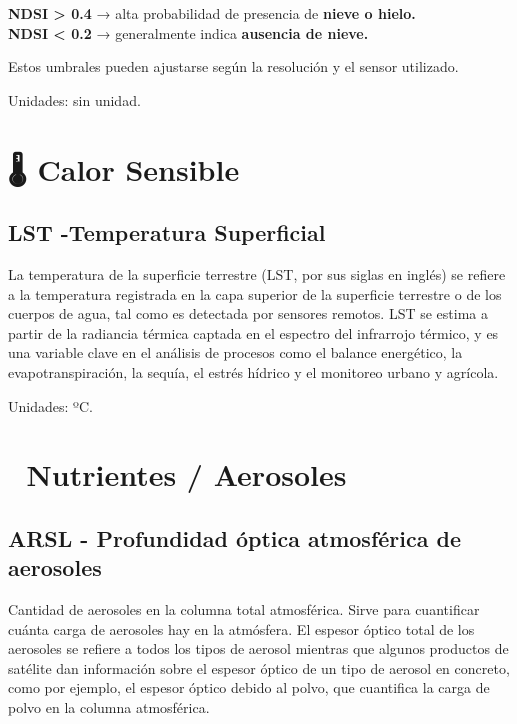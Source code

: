 \documentclass[
]{book}
\begin{document}
\textbf{NDSI \textgreater{} 0.4} → alta probabilidad de presencia de \textbf{nieve o hielo.}\\
\textbf{NDSI \textless{} 0.2} → generalmente indica \textbf{ausencia de nieve.}

Estos umbrales pueden ajustarse según la resolución y el sensor utilizado.

Unidades: sin unidad.

\section{\texorpdfstring{\textbf{🌡️ Calor Sensible}}{🌡️ Calor Sensible}}\label{calor-sensible-1}

\subsection{\texorpdfstring{\textbf{LST} -Temperatura Superficial}{LST -Temperatura Superficial}}\label{lst--temperatura-superficial-1}

La temperatura de la superficie terrestre (LST, por sus siglas en inglés) se refiere a la temperatura registrada en la capa superior de la superficie terrestre o de los cuerpos de agua, tal como es detectada por sensores remotos. LST se estima a partir de la radiancia térmica captada en el espectro del infrarrojo térmico, y es una variable clave en el análisis de procesos como el balance energético, la evapotranspiración, la sequía, el estrés hídrico y el monitoreo urbano y agrícola.

Unidades: ºC.

\section{\texorpdfstring{\textbf{💨 Nutrientes / Aerosoles}}{💨 Nutrientes / Aerosoles}}\label{nutrientes-aerosoles-1}

\subsection{\texorpdfstring{\textbf{ARSL} - Profundidad óptica atmosférica de aerosoles}{ARSL - Profundidad óptica atmosférica de aerosoles}}\label{arsl---profundidad-uxf3ptica-atmosfuxe9rica-de-aerosoles-1}

Cantidad de aerosoles en la columna total atmosférica. Sirve para cuantificar cuánta carga de aerosoles hay en la atmósfera. El espesor óptico total de los aerosoles se refiere a todos los tipos de aerosol mientras que algunos productos de satélite dan información sobre el espesor óptico de un tipo de aerosol en concreto, como por ejemplo, el espesor óptico debido al polvo, que cuantifica la carga de polvo en la columna atmosférica.
\end{document}
